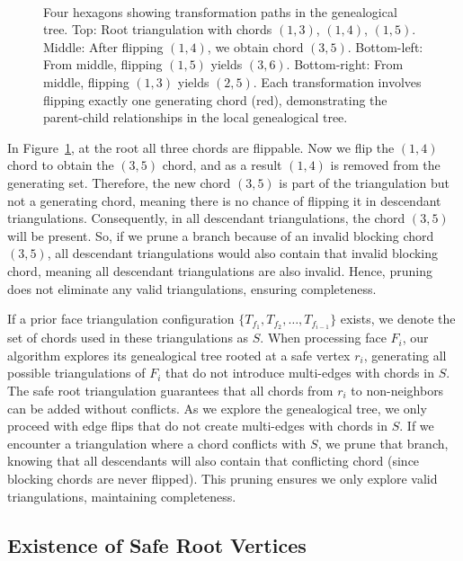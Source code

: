 ﻿﻿\documentclass[12pt,a4paper]{article}
\theoremstyle{definition}
\theoremstyle{remark}
\begin{document}
\begin{figure}[h]
\begin{tikzpicture}[scale=1.2, every node/.style={circle, draw, fill=white, inner sep=2pt}]
	\end{tikzpicture}
	\caption{Four hexagons showing transformation paths in the genealogical tree. Top: Root triangulation with chords $(1,3)$, $(1,4)$, $(1,5)$. Middle: After flipping $(1,4)$, we obtain chord $(3,5)$. Bottom-left: From middle, flipping $(1,5)$ yields $(3,6)$. Bottom-right: From middle, flipping $(1,3)$ yields $(2,5)$. Each transformation involves flipping exactly one generating chord (red), demonstrating the parent-child relationships in the local genealogical tree.}
	\label{fig:four_hexagons_arrows}
\end{figure}

In Figure~\ref{fig:four_hexagons_arrows}, at the root all three chords are flippable. Now we flip the $(1,4)$ chord to obtain the $(3,5)$ chord, and as a result $(1,4)$ is removed from the generating set. Therefore, the new chord $(3,5)$ is part of the triangulation but not a generating chord, meaning there is no chance of flipping it in descendant triangulations. Consequently, in all descendant triangulations, the chord $(3,5)$ will be present. So, if we prune a branch because of an invalid blocking chord $(3,5)$, all descendant triangulations would also contain that invalid blocking chord, meaning all descendant triangulations are also invalid. Hence, pruning does not eliminate any valid triangulations, ensuring completeness.

If a prior face triangulation configuration $\{T_{f_1}, T_{f_2}, \ldots, T_{f_{i-1}}\}$ exists, we denote the set of chords used in these triangulations as $S$. When processing face $F_i$, our algorithm explores its genealogical tree rooted at a safe vertex $r_i$, generating all possible triangulations of $F_i$ that do not introduce multi-edges with chords in $S$. The safe root triangulation guarantees that all chords from $r_i$ to non-neighbors can be added without conflicts. As we explore the genealogical tree, we only proceed with edge flips that do not create multi-edges with chords in $S$. If we encounter a triangulation where a chord conflicts with $S$, we prune that branch, knowing that all descendants will also contain that conflicting chord (since blocking chords are never flipped). This pruning ensures we only explore valid triangulations, maintaining completeness.

\subsection{Existence of Safe Root Vertices}
\label{proof:saferoot}
\end{document}
